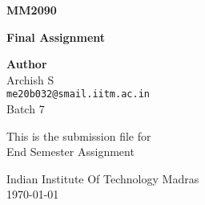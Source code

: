 \documentclass[12pt,a4paper]{article}
\begin{document}
\begin{titlepage}
	\begin{center}
		\vspace*{1cm}
		\Huge
		\textbf{MM2090}
		
		\vspace{0.5cm}
		\Large
		\textbf{Final Assignment}
            
		\vspace{1.5cm}
		\textbf{Author}\\
		\vspace{0.25cm}
		\large
		\textsf{Archish S}\\
		\vspace{0.2cm}
		\normalsize
		\texttt{me20b032@smail.iitm.ac.in} \\
		Batch 7
		\\
		
		\vfill
       
		This is the submission file for \\
		\Large       
		End Semester Assignment 
        
        \normalsize    
		\vspace{0.8cm}
           
		Indian Institute Of Technology Madras\\
		\today
            
	\end{center}
\end{titlepage}

\tableofcontents
\newpage


\clearpage

\clearpage

\clearpage

\clearpage

\clearpage

\clearpage
\end{document}
